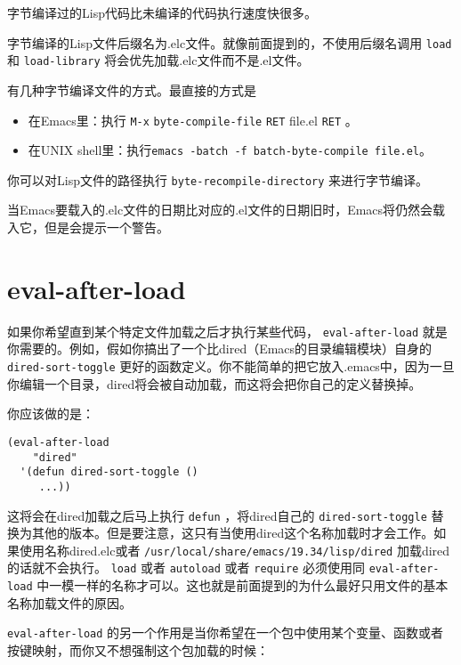 字节编译过的Lisp代码比未编译的代码执行速度快很多。

字节编译的Lisp文件后缀名为.elc文件。就像前面提到的，不使用后缀名调用 \texttt{load} 和 \texttt{load-library} 将会优先加载.elc文件而不是.el文件。

有几种字节编译文件的方式。最直接的方式是

\begin{itemize}
 \item 在Emacs里：执行 \verb|M-x| \texttt{byte-compile-file} \verb|RET| file.el \verb|RET| 。
 \item 在UNIX shell里：执行\texttt{emacs -batch -f batch-byte-compile file.el}。
\end{itemize}

你可以对Lisp文件的路径执行 \texttt{byte-recompile-directory} 来进行字节编译。

当Emacs要载入的.elc文件的日期比对应的.el文件的日期旧时，Emacs将仍然会载入它，但是会提示一个警告。

\section{eval-after-load}
\label{section:05-eval-after-load}

如果你希望直到某个特定文件加载之后才执行某些代码， \texttt{eval-after-load} 就是你需要的。例如，假如你搞出了一个比dired（Emacs的目录编辑模块）自身的 \texttt{dired-sort-toggle} 更好的函数定义。你不能简单的把它放入.emacs中，因为一旦你编辑一个目录，dired将会被自动加载，而这将会把你自己的定义替换掉。

你应该做的是：

\begin{verbatim}
(eval-after-load
    "dired"
  '(defun dired-sort-toggle ()
     ...))
\end{verbatim}

这将会在dired加载之后马上执行 \texttt{defun} ，将dired自己的 \texttt{dired-sort-toggle} 替换为其他的版本。但是要注意，这只有当使用dired这个名称加载时才会工作。如果使用名称dired.elc或者 \verb|/usr/local/share/emacs/19.34/lisp/dired| 加载dired的话就不会执行。 \texttt{load} 或者 \texttt{autoload} 或者 \texttt{require} 必须使用同 \texttt{eval-after-load} 中一模一样的名称才可以。这也就是前面提到的为什么最好只用文件的基本名称加载文件的原因。

 \texttt{eval-after-load} 的另一个作用是当你希望在一个包中使用某个变量、函数或者按键映射，而你又不想强制这个包加载的时候：

